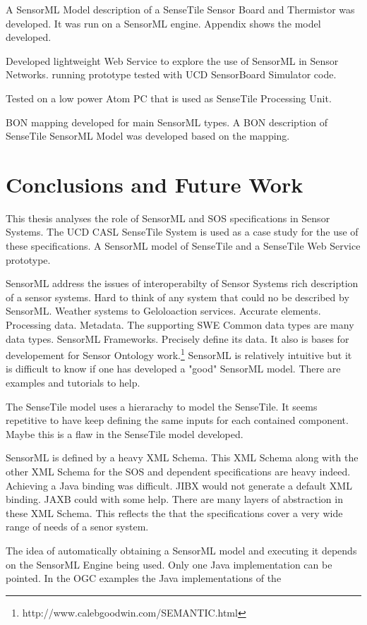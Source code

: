 \documentclass[]{final_report}
\begin{document}
A  SensorML Model description of a SenseTile Sensor Board and Thermistor was developed. It was
run on a SensorML engine. Appendix shows the model developed.

Developed lightweight Web Service to explore the use of SensorML in Sensor Networks.
running prototype tested with UCD SensorBoard Simulator code.

Tested on a low power Atom PC that is used as SenseTile Processing Unit.

BON mapping developed for main SensorML types. A BON description of SenseTile SensorML Model
was developed based on the mapping.

\chapter{ Conclusions and Future Work}
This thesis analyses the role of SensorML and SOS specifications in Sensor Systems. The UCD CASL SenseTile System is used as a case study for the use of these specifications. A SensorML model of SenseTile and a SenseTile Web Service prototype.

SensorML address the issues of interoperabilty of Sensor Systems
rich description of a sensor systems. Hard to think of any system that could no be described by SensorML. Weather systems to Geloloaction services. 
Accurate elements. Processing data. Metadata.
The supporting SWE Common data types are many data types.
SensorML Frameworks.
Precisely define its data.
It also is bases for developement for Sensor Ontology work.\footnote{http://www.calebgoodwin.com/SEMANTIC.html}
SensorML is relatively intuitive but it is difficult to know if one has developed a "good" SensorML model. There are examples and tutorials to help. 

The SenseTile model uses a hierarachy to model the SenseTile. It seems repetitive to have keep defining the same inputs for each contained component. Maybe this is a flaw in the SenseTile model developed.

SensorML is defined by a heavy XML Schema. This XML Schema along with the other XML Schema for the SOS and dependent specifications are heavy indeed. Achieving a Java binding was difficult. JIBX would not generate a default XML binding. JAXB could with some help. There are many layers of abstraction in these XML Schema. This reflects the that the specifications cover a very wide range of needs of a senor system.

The idea of automatically obtaining a SensorML model and executing it depends on the SensorML Engine being used. Only one Java implementation can be pointed. In the OGC examples the Java implementations of the 
\end{document}
